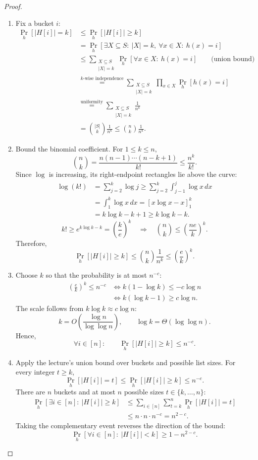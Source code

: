\documentclass[12pt,a4paper]{article}
\begin{document}
\begin{proof}
\begin{enumerate}
\item Fix a bucket $i$:
\[
\begin{aligned}
\Pr_h[|H[i]|=k]
&\leq\Pr_h[|H[i]|\geq k]\\
&=\Pr_h[\exists X\subseteq S:\ |X|=k,\ \forall x\in X:\ h(x)=i]\\
&\leq\sum_{\substack{X\subseteq S\\|X|=k}}
 \Pr_h[\forall x\in X:\ h(x)=i]
 \qquad\text{(union bound)}\\
&\overset{k\text{-wise independence}}{=}\sum_{\substack{X\subseteq S\\|X|=k}}
 \prod_{x\in X}\Pr_h[h(x)=i]
 \\
&\overset{\text{uniformity}}{=}\sum_{\substack{X\subseteq S\\|X|=k}}\frac1{n^k}\\
&=\binom{|S|}{k}\frac1{n^k}
\leq\binom nk\frac1{n^k}.
\end{aligned}
\]

\item Bound the binomial coefficient. For $1\leq k\leq n$,
\[
\binom nk
=\frac{n(n-1)\cdots(n-k+1)}{k!}
\leq\frac{n^k}{k!}.
\]
Since $\log$ is increasing, its right-endpoint rectangles lie above the curve:
\[
\begin{aligned}
\log(k!)
&=\sum_{j=2}^{k}\log j
\geq\sum_{j=2}^{k}\int_{j-1}^{j}\log x\,dx\\
&=\int_1^k\log x\,dx
=[x\log x-x]_1^k\\
&=k\log k-k+1\geq k\log k-k.
\end{aligned}
\]
\[
k!\geq e^{k\log k-k}=\left(\frac{k}{e}\right)^k
\quad\Longrightarrow\quad
\binom nk\leq\left(\frac{ne}{k}\right)^k.
\]
Therefore,
\[
\boxed{\Pr_h[|H[i]|\geq k]
\leq\binom nk\frac1{n^k}
\leq\left(\frac ek\right)^k.}
\]

\item Choose $k$ so that the probability is at most $n^{-c}$:
\[
\begin{aligned}
\left(\frac ek\right)^k\leq n^{-c}
&\iff k(1-\log k)\leq-c\log n\\
&\iff k(\log k-1)\geq c\log n.
\end{aligned}
\]
The scale follows from $k\log k\approx c\log n$:
\[
k=O\!\left(\frac{\log n}{\log\log n}\right),\qquad
\log k=\Theta(\log\log n).
\]
Hence,
\[
\forall i\in[n]:\qquad
\Pr_h[|H[i]|\geq k]\leq n^{-c}.
\]

\item Apply the lecture's union bound over buckets and possible list sizes.
For every integer $t\geq k$,
\[
\Pr_h[|H[i]|=t]\leq\Pr_h[|H[i]|\geq k]\leq n^{-c}.
\]
There are $n$ buckets and at most $n$ possible sizes $t\in\{k,\ldots,n\}$:
\[
\begin{aligned}
\Pr_h[\exists i\in[n]:\ |H[i]|\geq k]
&\leq\sum_{i\in[n]}\sum_{t=k}^{n}\Pr_h[|H[i]|=t]\\
&\leq n\cdot n\cdot n^{-c}
=n^{2-c}.
\end{aligned}
\]
Taking the complementary event reverses the direction of the bound:
\[
\boxed{\Pr_h[\forall i\in[n]:\ |H[i]|<k]\geq1-n^{2-c}.}
\]


\end{enumerate}
\end{proof}
\end{document}
